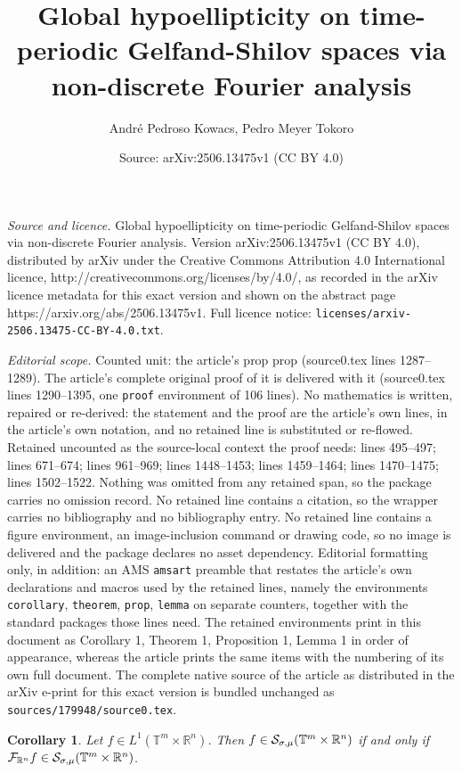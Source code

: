 \documentclass[10pt,a4paper]{amsart}
\title{Global hypoellipticity on time-periodic Gelfand-Shilov spaces via non-discrete Fourier analysis}
\author{Andr\'e Pedroso Kowacs, Pedro Meyer Tokoro}
\date{Source: arXiv:2506.13475v1 (CC BY 4.0)}
\newtheorem{corollary}{Corollary}
\newcommand{\G}{\mathnormal{\mathbb{T}^{m}\times\mathbb{R}^n}}
\newcommand{\R}{\mathbb{R}}
\renewcommand{\S}{\mathcal{S}_{\sigma,\mu}(\G)}
\newcommand{\T}{\mathbb{T}}
\begin{document}
\maketitle

\noindent\emph{Source and licence.} Global hypoellipticity on time-periodic Gelfand-Shilov spaces via non-discrete Fourier analysis. Version arXiv:2506.13475v1 (CC BY 4.0), distributed by arXiv under the Creative Commons Attribution 4.0 International licence, http://creativecommons.org/licenses/by/4.0/, as recorded in the arXiv licence metadata for this exact version and shown on the abstract page https://arxiv.org/abs/2506.13475v1. Full licence notice: \texttt{licenses/arxiv-2506.13475-CC-BY-4.0.txt}.\par\smallskip

\noindent\textit{Editorial scope.} Counted unit: the article's prop prop (source0.tex lines 1287--1289). The article's complete original proof of it is delivered with it (source0.tex lines 1290--1395, one \texttt{proof} environment of 106 lines). No mathematics is written, repaired or re-derived: the statement and the proof are the article's own lines, in the article's own notation, and no retained line is substituted or re-flowed.  Retained uncounted as the source-local context the proof needs: lines 495--497; lines 671--674; lines 961--969; lines 1448--1453; lines 1459--1464; lines 1470--1475; lines 1502--1522.  Nothing was omitted from any retained span, so the package carries no omission record.  No retained line contains a citation, so the wrapper carries no bibliography and no bibliography entry.  No retained line contains a figure environment, an image-inclusion command or drawing code, so no image is delivered and the package declares no asset dependency.  Editorial formatting only, in addition: an AMS \texttt{amsart} preamble that restates the article's own declarations and macros used by the retained lines, namely the environments \texttt{corollary}, \texttt{theorem}, \texttt{prop}, \texttt{lemma} on separate counters, together with the standard packages those lines need.  The retained environments print in this document as Corollary 1, Theorem 1, Proposition 1, Lemma 1 in order of appearance, whereas the article prints the same items with the numbering of its own full document.  The complete native source of the article as distributed in the arXiv e-print for this exact version is bundled unchanged as \texttt{sources/179948/source0.tex}.
    \begin{corollary}\label{coro_gelf_transf} 
        Let $f\in L^1(\T^m\times\R^n)$. Then $f\in\S$ if and only if $\mathcal{F}_{\R^n}f\in\S$.
    \end{corollary}
\end{document}
